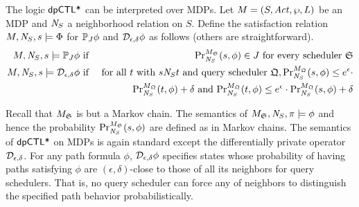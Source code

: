 The logic $\dpCTLstar$ can be interpreted over MDPs. 
Let $M = (S, \Act, \wp, L)$ be an MDP and $\neighbor{S}$ a
neighborhood relation on $S$. Define the satisfaction
relation $M, \neighbor{S}, s \models \Phi$ for $\PJ{J} \phi$ and
$\dpriv{\epsilon}{\delta} \phi$ as follows (others are straightforward).
\begin{eqnarray*}
  M, \neighbor{S}, s \models \PJ{J} \phi
  & \textmd{ if } &
  \myPr{s}{M_{\scheduler{S}}}{\neighbor{S}}{\phi} \in J
  \textmd{ for every scheduler } \scheduler{S}\\
  M, \neighbor{S}, s \models \dpriv{\epsilon}{\delta} \phi
  & \textmd{ if } &
  \textmd{for all } t \textmd{ with } s \neighbor{S} t \textmd{ and
   query scheduler } \scheduler{Q},
   \myPr{s}{M_{\scheduler{Q}}}{\neighbor{S}}{\phi} \leq
  e^{\epsilon} \cdot
   \\
  & &
   \myPr{t}{M_{\scheduler{Q}}}{\neighbor{S}}{\phi} + \delta
   \textmd{ and }
   \myPr{t}{M_{\scheduler{Q}}}{\neighbor{S}}{\phi} \leq e^{\epsilon} \cdot
   \myPr{s}{M_{\scheduler{Q}}}{\neighbor{S}}{\phi} + \delta
\end{eqnarray*}

Recall that $M_{\scheduler{S}}$ is but a Markov chain. The semantics
of $M_{\scheduler{S}}, \neighbor{S}, \pi \models \phi$ and hence the
probability $\myPr{s}{M_{\scheduler{S}}}{\neighbor{S}}{\phi}$ are
defined as in Markov chains.
The semantics of $\dpCTLstar$ on MDPs
is again standard except the differentially private operator
$\dpriv{\epsilon}{\delta}$. For any path formula $\phi$,
$\dpriv{\epsilon}{\delta} \phi$ specifies states whose probability
of having paths satisfying $\phi$ are $(\epsilon, \delta)$-close to
those of all its neighbors for query schedulers. That is, no
query scheduler can force any of neighbors to distinguish the
specified path behavior probabilistically.


